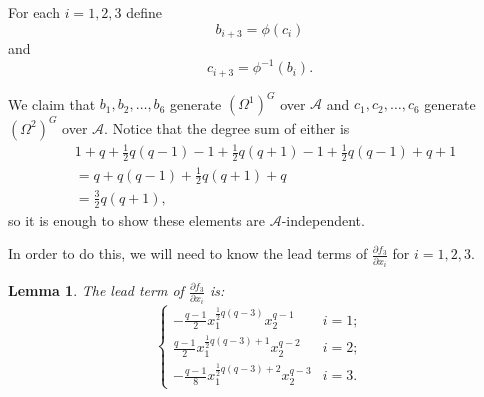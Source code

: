 \documentclass[a4paper]{amsart}
\newtheorem{Lemma}{Lemma}[section]
\newtheorem*{Corollary of Conjecture}{Corollary of Conjecture}
\theoremstyle{definition}
\theoremstyle{remark}
\theoremstyle{Acknowledgments}
\begin{document}
For each $i=1,2,3$ define
\[b_{i+3} = \phi(c_i)\]
and
\[c_{i+3} = \phi^{-1}(b_i).\]

We claim that $b_1,b_2, \ldots, b_6$ generate $(\Omega^1)^G$ over $\mathcal{A}$ and $c_1,c_2, \ldots, c_6$ generate $(\Omega^2)^G$ over $\mathcal{A}$. Notice that the degree sum of either is
\begin{align*}& 1+q+\frac12 q(q-1)-1+\frac12q (q+1)-1+\frac12 q(q-1)+q+1\\
&=q+ q(q-1)+\frac12q (q+1)+q\\
&=\frac32 q(q+1), \end{align*}
so it is enough to show these elements are $\mathcal{A}$-independent.

In order to do this, we will need to know the lead terms of $\frac{\partial f_3}{\partial x_i}$ for $i=1,2,3$.
\begin{Lemma}\label{leadterms}
 The lead term of  $\frac{\partial f_3}{\partial x_i}$ is:
\[\left\{ \begin{array}{lr} -\frac{q-1}{2}x_1^{\frac12 q(q-3)}x_2^{q-1} & i=1; \\
 \frac{q-1}{2}x_1^{\frac12 q(q-3)+1}x_2^{q-2} & i=2;\\
 -\frac{q-1}{8}x_1^{\frac12 q(q-3)+2}x_2^{q-3} & i=3. \end{array}\right.\]
\end{Lemma}
\end{document}
